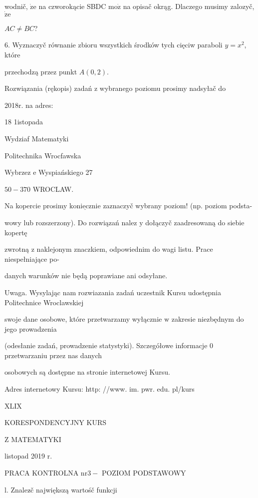 \documentclass[a4paper,12pt]{article}
\begin{document}
wodnič, $\dot{\mathrm{z}}\mathrm{e}$ na czworokącie SBDC $\mathrm{m}\mathrm{o}\dot{\mathrm{z}}$ na opisač okrąg. Dlaczego musimy zalozyč, $\dot{\mathrm{z}}\mathrm{e}$

$AC\neq BC$?

6. Wyznaczyč równanie zbioru wszystkich środków tych cięciw paraboli $y = x^{2}$, które

przechodzą przez punkt $A(0,2).$

Rozwiązania (rękopis) zadań z wybranego poziomu prosimy nadsyłač do

2018r. na adres:

18 1istopada

Wydziaf Matematyki

Politechnika Wrocfawska

Wybrzez $\mathrm{e}$ Wyspiańskiego 27

$50-370$ WROCLAW.

Na kopercie prosimy $\underline{\mathrm{k}\mathrm{o}\mathrm{n}\mathrm{i}\mathrm{e}\mathrm{c}\mathrm{z}\mathrm{n}\mathrm{i}\mathrm{e}}$ zaznaczyč wybrany poziom! (np. poziom podsta-

wowy lub rozszerzony). Do rozwiązań nalez $\mathrm{y}$ dołączyč zaadresowaną do siebie kopertę

zwrotną $\mathrm{z}$ naklejonym znaczkiem, odpowiednim do wagi listu. Prace niespełniające po-

danych warunków nie będą poprawiane ani odsyłane.

Uwaga. Wysylając nam rozwiazania zadań uczestnik Kursu udostępnia Politechnice Wroclawskiej

swoje dane osobowe, które przetwarzamy wyłącznie $\mathrm{w}$ zakresie niezbędnym do jego prowadzenia

(odesłanie zadań, prowadzenie statystyki). Szczegółowe informacje $0$ przetwarzaniu przez nas danych

osobowych są dostępne na stronie internetowej Kursu.

Adres internetowy Kursu: http: //www. im. pwr. edu. pl/kurs







XLIX

KORESPONDENCYJNY KURS

Z MATEMATYKI

listopad 2019 r.

PRACA KONTROLNA $\mathrm{n}\mathrm{r} 3-$ POZIOM PODSTAWOWY

l. Znalez$\acute{}$č największą wartośč funkcji
\end{document}
